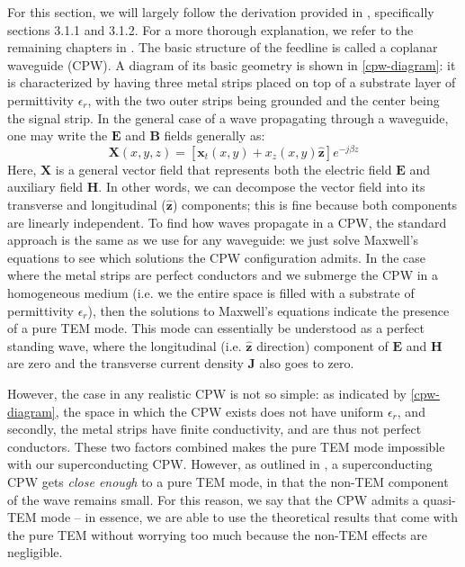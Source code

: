 For this section, we will largely follow the derivation provided in
\cite{gaoPhysicsSuperconductingMicrowave}, specifically sections 3.1.1 and 3.1.2. For a more thorough
explanation, we refer to the remaining chapters in \cite{gaoPhysicsSuperconductingMicrowave}.
The basic structure of the feedline is called a coplanar waveguide (CPW). A diagram of its basic geometry
is shown in \cref{cpw-diagram}: it is characterized by having three metal strips placed on top of a substrate
layer of permittivity \( \epsilon_r \), with the two outer strips being grounded and the center being the
signal strip. In the general case of a wave propagating through a waveguide, one may write the \( \mathbf{E}
\) and \( \mathbf{B} \) fields generally as:
\[
	\mathbf{X}(x, y, z) = [\mathbf{x}_t(x, y) + x_z(x, y) \mathbf{\hat{z}}] e^{-j \beta z}
\]
Here, \( \mathbf{X} \) is a general vector field that represents both the electric field \( \mathbf{E} \) and
auxiliary field \( \mathbf{H} \). In other words, we can decompose the vector field into its transverse and 
longitudinal (\( \mathbf{\hat{z}} \)) components; this is
fine because both components are linearly independent. To find how waves propagate in a CPW, the standard
approach is the same as we use for any waveguide: we just solve Maxwell's equations to see which solutions
the CPW configuration admits. 
In the case where the metal strips are perfect conductors and we submerge the CPW in a homogeneous medium
(i.e. we the entire space is filled with a substrate of permittivity \( \epsilon_r \)), then the solutions
to Maxwell's equations indicate the presence of a pure TEM mode. This mode can essentially be understood as a
perfect standing wave, where the longitudinal (i.e. \( \mathbf{\hat{z}} \) direction) component of \(
\mathbf{E} \) and \( \mathbf{H} \) are zero and the transverse current density \( \mathbf{J} \) also goes to
zero.

However, the case in any realistic CPW is not so simple: as indicated by \cref{cpw-diagram}, the space in
which the CPW exists does not have uniform \( \epsilon_r \), and secondly, the metal strips have finite
conductivity, and are thus not perfect conductors. These two factors combined makes the pure TEM mode
impossible with our superconducting CPW. However, as outlined in \cite{gaoPhysicsSuperconductingMicrowave}, a
superconducting CPW gets \textit{close enough} to a pure TEM mode, in that the non-TEM component of the wave
remains small. For this reason, we say that the CPW admits a quasi-TEM mode -- in essence, we are able to use
the theoretical results that come with the pure TEM without worrying too much because the non-TEM effects are
negligible.         
 
